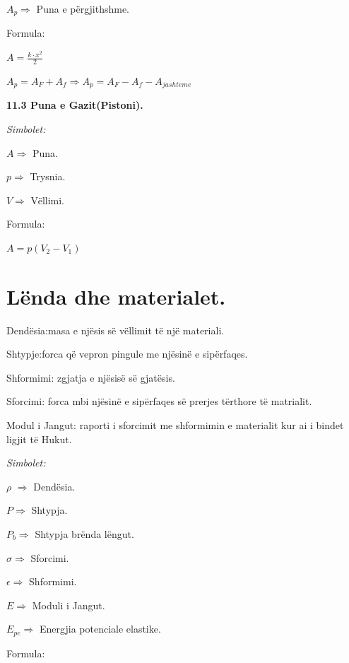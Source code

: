 \documentclass[twocolumn]{article}
\begin{document}
	$A_p \Rightarrow$ Puna e përgjithshme.
	
	\begin{center}
		Formula:
	\end{center}
	
	$A=\frac{k \cdot x^2}{2}$
	
	$A_p=A_F+A_f \Rightarrow A_p=A_F-A_f-A_{jashteme}$
	
	\textbf{11.3 Puna e Gazit(Pistoni).}
	
	\begin{center}
		\textit{Simbolet:}
	\end{center}
	
	$A \Rightarrow $ Puna.
	
	$p \Rightarrow $ Trysnia.
	
	$V \Rightarrow$  Vëllimi.
	
	\begin{center}
		Formula:
	\end{center}
	
	$A=p(V_2-V_1)$
	
	\section{Lënda dhe materialet.}
	
	Dendësia:masa e njësis së vëllimit të një materiali.
	
	Shtypje:forca që vepron pingule me njësinë e sipërfaqes.
	
	Shformimi: zgjatja e njësisë së gjatësis.
	
	Sforcimi: forca mbi njësinë e sipërfaqes së prerjes tërthore të matrialit.
	
	Modul i Jangut: raporti i sforcimit me shformimin e materialit kur ai i bindet ligjit të Hukut.
	
	\begin{center}
		\textit{Simbolet:}
	\end{center}
	
	$\rho$ $\Rightarrow$ Dendësia.
	
	$P \Rightarrow$ Shtypja.
	
	$P_b \Rightarrow $ Shtypja brënda lëngut.
	
	$\sigma \Rightarrow$ Sforcimi.
	
	$\epsilon \Rightarrow $ Shformimi.
	
	$E \Rightarrow$ Moduli i Jangut.
	
	$E_{pe} \Rightarrow $ Energjia potenciale elastike.
	
	\begin{center}
		Formula:
	\end{center}
	
\end{document}
